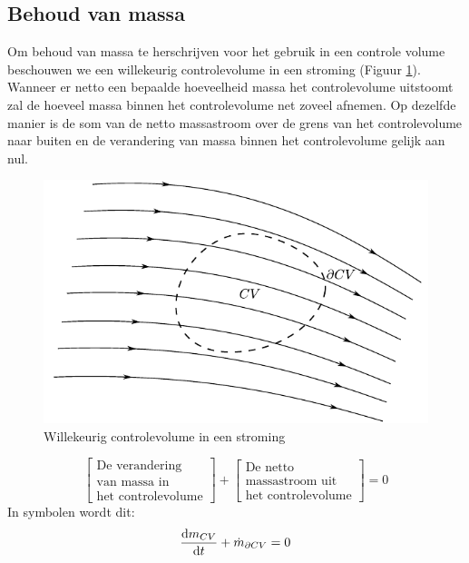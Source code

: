 			\subsection{Behoud van massa}
			\label{sec:Behoud van massa}
Om behoud van massa te herschrijven voor het gebruik in een controle volume beschouwen we een willekeurig controlevolume in een stroming (Figuur \ref{fig:controlevolume in stroming}). Wanneer er netto een bepaalde hoeveelheid massa het controlevolume uitstoomt zal de hoeveel massa binnen het controlevolume net zoveel afnemen. Op dezelfde manier is de som van de netto massastroom over de grens van het controlevolume naar buiten en de verandering van massa binnen het controlevolume gelijk aan nul.
\begin{figure}[htb]
	\centering
	\includegraphics{fig/controlevolumes/Controlevolume_met_stroomlijnen}
	\caption{Willekeurig controlevolume in een stroming}
	\label{fig:controlevolume in stroming}
\end{figure}
\begin{equation}
	\left[
		\begin{array}{c}
			\mbox{De verandering} \\ \mbox{van massa in} \\ \mbox{het controlevolume}
		\end{array}
	\right]
	+
	\left[
		\begin{array}{c}
			\mbox{De netto} \\ \mbox{massastroom uit} \\ \mbox{het controlevolume}
		\end{array}
	\right]
	= 0
	\label{eqn:controlevolume,behoud van massa,woorden}
\end{equation}
In symbolen wordt dit:
\begin{equation}
	\frac{\mathrm{d} m_{CV}}{\mathrm{d} t} + \dot{m}_{\partial CV} = 0
	\label{eqn:controlevolume,behoud van massa}
\end{equation}
